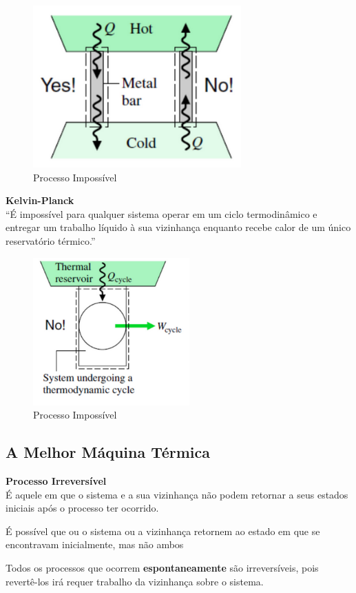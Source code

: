 \documentclass[a4paper, 12pt]{article}
\begin{document}
	\begin{figure}[h]
		\includegraphics[width = 8cm]{caca.png}
		\centering
		\caption{Processo Impossível}
	\end{figure}

\newpage
\textbf{Kelvin-Planck}\\
“É impossível para qualquer sistema
operar em um ciclo termodinâmico e
entregar um trabalho líquido à sua
vizinhança enquanto recebe calor de
um único reservatório térmico.”

	\begin{figure}[h]
		\includegraphics[width = 6cm]{kp.png}
		\centering
		\caption{Processo Impossível}
	\end{figure}

\subsection{A Melhor Máquina Térmica}
\textbf{Processo Irreversível}\\
É aquele em que o sistema e a sua vizinhança não podem retornar a seus estados
iniciais após o processo ter ocorrido.

É possível que ou o sistema ou a vizinhança retornem ao estado em que
se encontravam inicialmente, mas não ambos

Todos os processos que ocorrem \textbf{espontaneamente} são irreversíveis, pois
revertê-los irá requer trabalho da vizinhança sobre o sistema.\\
\end{document}
